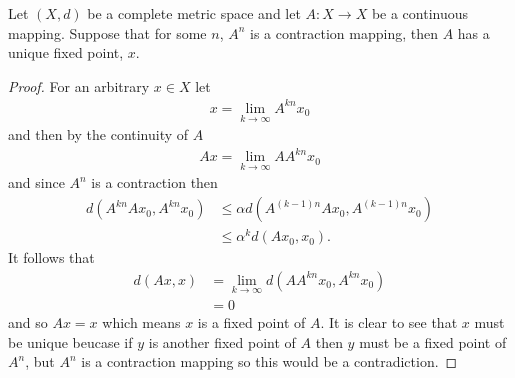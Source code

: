 \documentclass{article}
\begin{document}
\begin{corollary}
	\label{cor:banach-fixed-point}
	Let $ (X, d) $ be a complete metric space and let $ A:X \longrightarrow X $ be a continuous mapping. Suppose 
	that for some $ n $, $ A^n $ is a contraction mapping, then $ A $ has a unique fixed point, $ x $.
\end{corollary}
\begin{proof}
	For an arbitrary $ x \in X $ let
	\begin{align*}
		x = \lim_{k \longrightarrow \infty} A^{kn} x_0
	\end{align*}
	and then by the continuity of $ A $
	\begin{align*}
		Ax = \lim_{k \longrightarrow \infty} AA^{kn} x_0
	\end{align*}
	and since $ A^n $ is a contraction then 
	\begin{align*}
		d(A^{kn}Ax_0, A^{kn}x_0) &\leq \alpha d(A^{(k-1)n}Ax_0, A^{(k-1)n}x_0 ) \\
			&\leq \alpha^k d(Ax_0, x_0).
	\end{align*}
	It follows that 
	\begin{align*}
		d(Ax, x) &= \lim_{k \longrightarrow \infty} d(AA^{kn}x_0,A^{kn}x_0) \\
			&= 0
	\end{align*}
	and so $ Ax = x $ which means $ x $ is a fixed point of $ A $.
	It is clear to see that $ x $ must be unique beucase if $ y $ is another fixed point of $ A $
	then $ y $ must be a fixed point of $ A^n $, but $ A^n $ is a contraction mapping so this would
	be a contradiction.
\end{proof}
\end{document}
